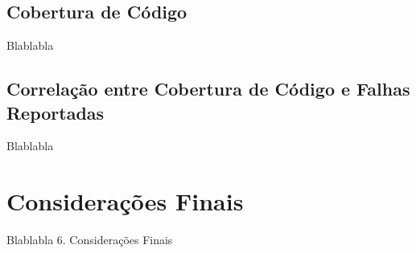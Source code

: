 \documentclass[11.5pt]{article}
\begin{document}
\subsection{Cobertura de Código}
Blablabla


\subsection{Correlação entre Cobertura de Código e Falhas Reportadas}
Blablabla




\section{Considerações Finais}
Blablabla
6. Considerações Finais







\clearpage
\end{document}
